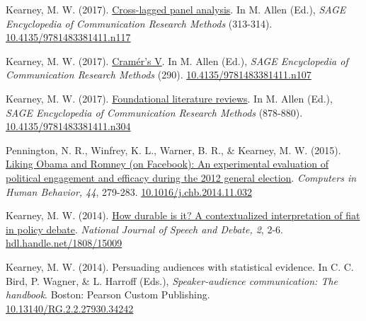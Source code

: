 \begin{bibenum}
\item[] Kearney, M. W. (2017).
	\href{http://mikewk.com/clpm.pdf}{Cross-lagged panel analysis}.
	In M. Allen (Ed.), \textit{SAGE Encyclopedia of Communication Research Methods} (313-314).
	\href{http://dx.doi.org/10.4135/9781483381411.n117}{10.4135/9781483381411.n117}

\item[] Kearney, M. W. (2017).
	\href{http://mikewk.com/cramersv.pdf}{Cram\'{e}r's V}.
	In M. Allen (Ed.), \textit{SAGE Encyclopedia of Communication Research Methods} (290).
	\href{http://dx.doi.org/10.4135/9781483381411.n107}{10.4135/9781483381411.n107}

\item[] Kearney, M. W. (2017).
	\href{http://mikewk.com/flr.pdf}{Foundational literature reviews}.
	In M. Allen (Ed.), \textit{SAGE Encyclopedia of Communication Research Methods} (878-880).
	\href{http://dx.doi.org/10.4135/9781483381411.n304}{10.4135/9781483381411.n304}

\item Pennington, N. R., Winfrey, K. L., Warner, B. R., \& Kearney, M. W. (2015).
	\href{http://www.researchgate.net/publication/269728178_Liking_Obama_and_Romney_(on_Facebook)_An_experimental_evaluation_of_political_engagement_and_efficacy_during_the_2012_general_election}{Liking Obama and Romney (on Facebook): An experimental evaluation of political engagement and efficacy during the 2012 general election}.
	\textit{Computers in Human Behavior, 44}, 279-283.
	\href{https://doi.org/10.1016/j.chb.2014.11.032}{10.1016/j.chb.2014.11.032}

\item Kearney, M. W. (2014). \href{http://ssrn.com/abstract=2618298}{
	How durable is it? A contextualized interpretation of fiat in policy debate}.
	\textit{National Journal of Speech and Debate, 2}, 2-6.
	\href{http://hdl.handle.net/1808/15009}{hdl.handle.net/1808/15009}

\item[] Kearney, M. W. (2014). Persuading audiences with statistical evidence.
	In C. C. Bird, P. Wagner, \& L. Harroff (Eds.), \textit{Speaker-audience communication: The handbook}. Boston: Pearson Custom Publishing.\\
	\href{https://dx.doi.org/10.13140/RG.2.2.27930.34242}{10.13140/RG.2.2.27930.34242}

\end{bibenum}

